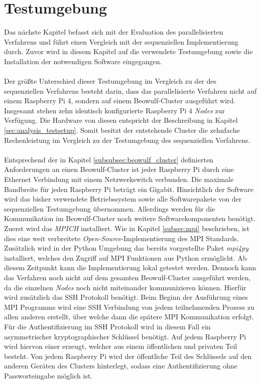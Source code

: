 \section{Testumgebung}
\label{sec:test_env_parallel}
Das nächste Kapitel befasst sich mit der Evaluation des parallelisierten Verfahrens und führt einen Vergleich mit der sequenziellen Implementierung durch. Zuvor wird in diesem Kapitel auf die verwendete Testumgebung sowie die Installation der notwendigen Software eingegangen. 
\\\\
Der größte Unterschied dieser Testumgebung im Vergleich zu der des sequenziellen Verfahrens besteht darin, dass das parallelisierte Verfahren nicht auf einem Raspberry Pi 4, sondern auf einem Beowulf-Cluster ausgeführt wird. Insgesamt stehen zehn identisch konfigurierte Raspberry Pi 4 \emph{Nodes} zur Verfügung. Die Hardware von diesen entspricht der Beschreibung in Kapitel \ref{sec:analysis_testsetup}. Somit besitzt der entstehende Cluster die zehnfache Rechenleistung im Vergleich zu der Testumgebung des sequenziellen Verfahrens.
\\\\
Entsprechend  der in Kapitel \ref{subsubsec:beowulf_cluster} definierten Anforderungen an einen Beowulf-Cluster ist jeder Raspberry Pi durch eine Ethernet Verbindung mit einem Netzwerkswitch verbunden. Die maximale Bandbreite für jeden Raspberry Pi beträgt ein Gigabit. Hinsichtlich der Software wird das bisher verwendete Betriebssystem sowie alle Softwarepakete von der sequenziellen Testumgebung übernommen. Allerdings werden für die Kommunikation im Beowulf-Cluster noch weitere Softwarekomponenten benötigt. Zuerst wird das \emph{MPICH} installiert. Wie in Kapitel \ref{subsec:mpi} beschrieben, ist dies eine weit verbreitete \emph{Open-Source}-Implementierung des \ac{MPI} Standards. Zusätzlich wird in der Python Umgebung das bereits vorgestellte Paket \emph{mpi4py} installiert, welches den Zugriff auf \ac{MPI} Funktionen aus Python ermöglicht. Ab diesem Zeitpunkt kann die Implementierung lokal getestet werden. Dennoch kann das Verfahren noch nicht auf dem gesamten Beowulf-Cluster ausgeführt werden, da die einzelnen \emph{Nodes} noch nicht miteinander kommunizieren können. Hierfür wird zusätzlich das \ac{SSH} Protokoll benötigt. Beim Beginn der Ausführung eines \ac{MPI} Programms wird eine \ac{SSH} Verbindung von jedem teilnehmenden Prozess zu allen anderen erstellt, über welche dann die spätere \ac{MPI} Kommunikation erfolgt. Für die Authentifizierung im \ac{SSH} Protokoll wird in diesem Fall ein asymmetrischer kryptographischer Schlüssel benötigt. Auf jedem Raspberry Pi wird hiervon einer erzeugt, welcher aus einem öffentlichen und privaten Teil besteht. Von jedem Raspberry Pi wird der öffentliche Teil des Schlüssels auf den anderen Geräten des Clusters hinterlegt, sodass eine Authentifizierung ohne Passworteingabe möglich ist.
